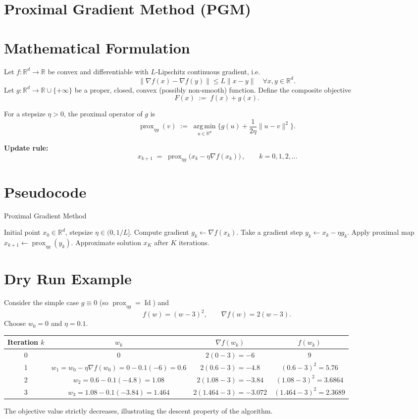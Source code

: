 \documentclass[11pt]{article}
\newcommand{\prox}{\operatorname{prox}}
\newcommand{\argmin}{\operatorname*{arg\,min}}
\begin{document}
\section*{Proximal Gradient Method (PGM)}

\section*{Mathematical Formulation}
Let $f:\mathbb{R}^{d}\rightarrow\mathbb{R}$ be convex and differentiable with $L$‑Lipschitz continuous gradient, i.e.
\[
\|\nabla f(x)-\nabla f(y)\|\le L\|x-y\|\quad\forall x,y\in\mathbb{R}^{d}.
\]
Let $g:\mathbb{R}^{d}\rightarrow\mathbb{R}\cup\{+\infty\}$ be a proper, closed, convex (possibly non‑smooth) function.  
Define the composite objective
\[
F(x)\;:=\;f(x)+g(x).
\]

For a stepsize $\eta>0$, the proximal operator of $g$ is
\[
\prox_{\eta g}(v)\;:=\;\argmin_{u\in\mathbb{R}^{d}}\Big\{ g(u)+\frac{1}{2\eta}\|u-v\|^{2}\Big\}.
\]

\textbf{Update rule:}
\[
\boxed{\,x_{k+1}\;=\;\prox_{\eta g}\!\big(x_{k}-\eta\nabla f(x_{k})\big)\,},\qquad k=0,1,2,\dots
\]

\section*{Pseudocode}
\begin{algorithm}[H]
\caption{Proximal Gradient Method}
\begin{algorithmic}[1]
\Require Initial point $x_{0}\in\mathbb{R}^{d}$, stepsize $\eta\in(0,1/L]$.
    \State Compute gradient $g_{k}\gets \nabla f(x_{k})$.
    \State Take a gradient step $y_{k}\gets x_{k}-\eta g_{k}$.
    \State Apply proximal map $x_{k+1}\gets \prox_{\eta g}(y_{k})$.
\EndFor
\Ensure Approximate solution $x_{K}$ after $K$ iterations.
\end{algorithmic}
\end{algorithm}

\section*{Dry Run Example}
Consider the simple case $g\equiv0$ (so $\prox_{\eta g}=\operatorname{Id}$) and 
\[
f(w)=(w-3)^{2},\qquad \nabla f(w)=2(w-3).
\]
Choose $w_{0}=0$ and $\eta=0.1$.

\begin{center}
\begin{tabular}{c|c|c|c}
Iteration $k$ & $w_{k}$ & $\nabla f(w_{k})$ & $f(w_{k})$\\ \hline
0 & $0$ & $2(0-3)=-6$ & $9$\\
1 & $w_{1}=w_{0}-\eta\nabla f(w_{0})=0-0.1(-6)=0.6$ & $2(0.6-3)=-4.8$ & $(0.6-3)^{2}=5.76$\\
2 & $w_{2}=0.6-0.1(-4.8)=1.08$ & $2(1.08-3)=-3.84$ & $(1.08-3)^{2}=3.6864$\\
3 & $w_{3}=1.08-0.1(-3.84)=1.464$ & $2(1.464-3)=-3.072$ & $(1.464-3)^{2}=2.3689$
\end{tabular}
\end{center}
The objective value strictly decreases, illustrating the descent property of the algorithm.
\end{document}
